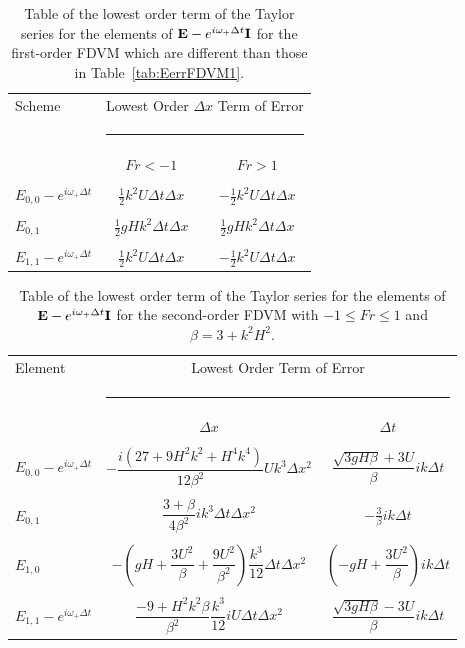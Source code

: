 \begin{table}
	\begin{tabular}{l  c  c}
	\hline
		Scheme &\multicolumn{2}{c}{Lowest Order $\Delta x$ Term of Error}\\
		&  \multicolumn{2}{l}{\rule{0.7\textwidth}{0.4pt}} \\
		& $Fr < -1$&$ Fr> 1$\\
		\hline & \\
		$E_{0,0} -  e^{i \omega_+ \Delta t} $& $ \frac{1}{2} k^2 U \Delta t \Delta x$ &  $- \frac{1}{2} k^2 U \Delta t \Delta x$  \\  &  \\
		$E_{0,1}$& $\frac{1}{2}gHk^2 \Delta t \Delta x $ & $\frac{1}{2}gHk^2 \Delta t \Delta x $   \\  &  \\
		$E_{1,1} -  e^{i \omega_+ \Delta t}$& $ \frac{1}{2} k^2 U \Delta t \Delta x$ & $- \frac{1}{2} k^2 U \Delta t \Delta x$   \\ 
	\hline
	\end{tabular}
	\caption{Table of the lowest order term of the Taylor series for the elements of $\mathbf{E} - e^{i \omega_+ \Delta t} \mathbf{I}$ for the first-order FDVM which are different than those in Table~\ref{tab:EerrFDVM1}. }
	\label{tab:EerrFDVM1super} 
\end{table}

\begin{table}
	\begin{tabular}{l  c c}
	\hline
		Element & \multicolumn{2}{c}{Lowest Order Term of Error}\\
		&  \multicolumn{2}{l}{\rule{0.7\textwidth}{0.4pt}} \\
		& $\Delta x$&$\Delta t$\\
		\hline && \\
		$E_{0,0} -  e^{i \omega_+ \Delta t} $& $ -\dfrac{i \left(27 + 9H^2k^2 + H^4k^4\right)}{12\beta^2} U k^3 \Delta x^2$ & $\dfrac{\sqrt{3gH \beta} + 3U}{\beta} ik \Delta t$ \\ & & \\
		$E_{0,1}$& $ \dfrac{3 + \beta}{4 \beta^2}i k^3\Delta  t\Delta x^2$ &  $ - \frac{3}{\beta} ik\Delta t$ \\ & & \\
		$E_{1,0}$& $ -\left(gH + \dfrac{3U^2}{\beta} + \dfrac{9U^2}{\beta^2}\right)  \dfrac{k^3}{12}\Delta t\Delta x^2$ &  $ \left(-gH + \dfrac{3U^2}{\beta}\right)ik \Delta t$ \\ & & \\
		$E_{1,1} -  e^{i \omega_+ \Delta t}$& $ \dfrac{-9 + H^2k^2\beta}{\beta^2} \dfrac{k^3}{12} i U \Delta t\Delta x^2$ & $\dfrac{\sqrt{3gH \beta} - 3U}{\beta} ik \Delta t$ \\
		\hline 
	\end{tabular}
	\caption{Table of the lowest order term of the Taylor series for the elements of $\mathbf{E} - e^{i \omega_+ \Delta t} \mathbf{I}$ for the second-order FDVM with $ -1 \le Fr \le 1$ and $\beta = 3 + k^2 H^2$.}
	\label{tab:EerrFDVM2} 
\end{table}


